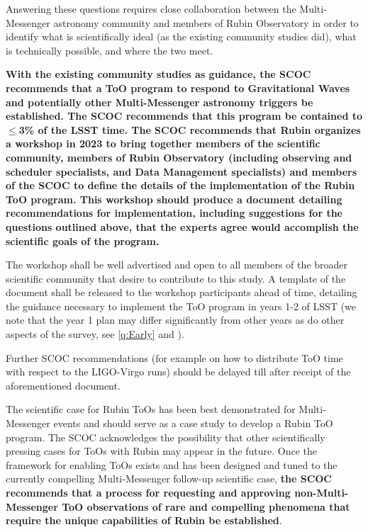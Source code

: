 Answering these questions requires close collaboration between the Multi-Messenger astronomy community and members of Rubin Observatory in order to identify what is scientifically ideal (as the existing community studies did), what is technically possible, and where the two meet. 

{\bf With the existing community studies as guidance, the SCOC recommends that a ToO program to respond to Gravitational Waves and potentially other Multi-Messenger astronomy triggers be established. The SCOC recommends that this program be contained to $\leq$3\% of the LSST time. The SCOC recommends that Rubin organizes a workshop in 2023 to bring together members of the scientific community, members of Rubin Observatory (including observing and scheduler specialists, and Data Management specialists) and members of the SCOC to define the details of the implementation of the Rubin ToO program. This workshop should produce a document detailing recommendations for implementation, including suggestions for the questions outlined above, that the experts agree would accomplish the scientific goals of the program.}


The workshop shall be well advertised and open to all members of the broader scientific community that desire to contribute to this study. A template of the document shall be released to the workshop participants ahead of time, detailing the guidance necessary to implement the ToO program in years 1-2 of LSST (we note that the year 1 plan may differ significantly from other years as do other aspects of the survey, see \autoref{q:Early} and \citealt{rtn-011}). 

Further SCOC recommendations (for example on how to distribute ToO time with respect to the LIGO-Virgo runs) should be delayed till after receipt of the aforementioned document. 

The scientific case for Rubin ToOs has been best demonstrated for Multi-Messenger events and should serve as a case study to develop a Rubin ToO program. The SCOC acknowledges the possibility that other scientifically pressing cases for ToOs with Rubin may appear in the future. Once the framework for enabling ToOs exists and has been designed and tuned to the currently compelling Multi-Messenger follow-up scientific case, {\bf the SCOC recommends that a process for requesting and approving non-Multi-Messenger ToO observations of rare and compelling phenomena that require the unique capabilities of Rubin be established}.
